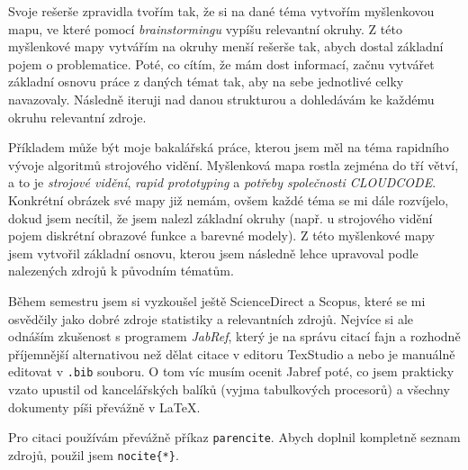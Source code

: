 \documentclass[FM,SP,localfonts]{tulthesis}
\begin{document}
Svoje rešerše zpravidla tvořím tak, že si na dané téma vytvořím myšlenkovou mapu, ve které pomocí \textit{brainstormingu} vypíšu relevantní okruhy. Z této myšlenkové mapy vytvářím na okruhy menší rešerše tak, abych dostal základní pojem o problematice. Poté, co cítím, že mám dost informací, začnu vytvářet základní osnovu práce z daných témat tak, aby na sebe jednotlivé celky navazovaly. Následně iteruji nad danou strukturou a dohledávám ke každému okruhu relevantní zdroje.

Příkladem může být moje bakalářská práce, kterou jsem měl na téma rapidního vývoje algoritmů strojového vidění. Myšlenková mapa rostla zejména do tří větví, a to je \textit{strojové vidění}, \textit{rapid prototyping} a \textit{potřeby společnosti CLOUDCODE}. Konkrétní obrázek své mapy již nemám, ovšem každé téma se mi dále rozvíjelo, dokud jsem necítil, že jsem nalezl základní okruhy (např. u strojového vidění pojem diskrétní obrazové funkce a barevné modely). Z této myšlenkové mapy jsem vytvořil základní osnovu, kterou jsem následně lehce upravoval podle nalezených zdrojů k původním tématům.

Během semestru jsem si vyzkoušel ještě ScienceDirect a Scopus, které se mi osvědčily jako dobré zdroje statistiky a relevantních zdrojů. Nejvíce si ale odnáším zkušenost s programem \textit{JabRef}, který je na správu citací fajn a rozhodně příjemnější alternativou než dělat citace v editoru TexStudio a nebo je manuálně editovat v  \texttt{.bib} souboru. O tom víc musím ocenit Jabref poté, co jsem prakticky vzato upustil od kancelářských balíků (vyjma tabulkových procesorů) a všechny dokumenty píši převážně v \LaTeX.

Pro citaci používám převážně příkaz \texttt{parencite}. Abych doplnil kompletně seznam zdrojů, použil jsem \texttt{nocite\{*\}}.

\nocite{*}
\printbibliography[title={Reference}]
\end{document}
